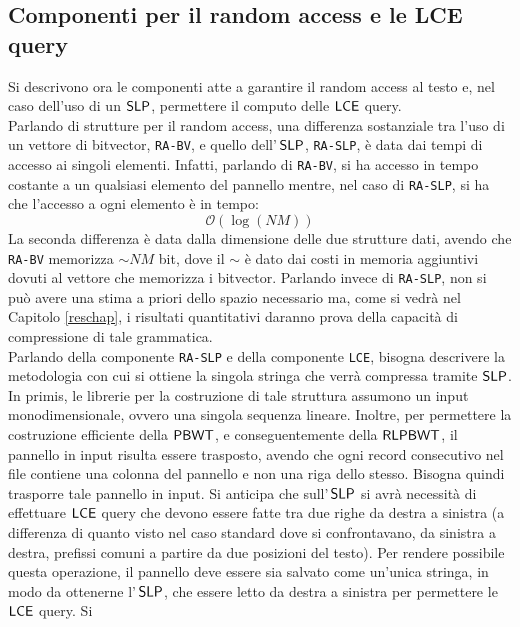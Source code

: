\subsection{Componenti per il random access e le LCE query}
Si descrivono ora le componenti atte a garantire il
random access
al testo e, nel caso dell'uso di un $\mbox{\rm {\sf SLP}}$, permettere il computo delle
$\mbox{\rm {\sf LCE}}$ query.\\
Parlando di strutture per il random access, una differenza sostanziale tra
l'uso di un vettore di bitvector, \texttt{RA-BV}, e quello
dell'$\,\mbox{\rm {\sf SLP}}$, \texttt{RA-SLP}, è data dai tempi di accesso ai singoli
elementi. Infatti, parlando di \texttt{RA-BV}, si ha accesso in tempo costante
a un qualsiasi elemento del pannello mentre, nel caso di \texttt{RA-SLP}, si ha
che l'accesso a ogni elemento è in tempo:
\begin{equation}
  \label{eq:timera}
  \mathcal{O}(\log (\mathit{NM}))
\end{equation}
La seconda differenza è data
dalla dimensione delle due strutture dati, avendo che \texttt{RA-BV} memorizza
$\sim \mathit{NM}$ bit, dove il $\sim$ è dato dai costi in memoria aggiuntivi
dovuti 
al vettore che memorizza i bitvector. Parlando invece di
\texttt{RA-SLP}, non si può avere una stima a priori dello spazio necessario ma,
come si vedrà nel Capitolo \ref{reschap}, i risultati quantitativi daranno prova
della capacità di compressione di tale grammatica.\\
Parlando della componente \texttt{RA-SLP} e della componente
\texttt{LCE}, bisogna descrivere la metodologia con cui 
si ottiene la singola stringa che verrà compressa tramite $\mbox{\rm {\sf SLP}}$.
In primis, le
librerie per la costruzione di tale struttura assumono un input
monodimensionale, ovvero una singola sequenza lineare. Inoltre, per
permettere la costruzione efficiente della $\mbox{\rm {\sf PBWT}}$, e conseguentemente
della $\mbox{\rm {\sf RLPBWT}}$, il pannello in input risulta essere trasposto, avendo che
ogni record consecutivo nel file contiene una colonna del pannello e non una
riga dello stesso. Bisogna
quindi trasporre tale pannello in input. Si anticipa che sull'$\,\mbox{\rm {\sf SLP}}$
si avrà  
necessità di effettuare $\mbox{\rm {\sf LCE}}$ query che devono essere fatte tra
due righe da destra a sinistra (a differenza 
di quanto visto nel caso standard dove si confrontavano, da sinistra a destra,
prefissi comuni a partire da due posizioni del testo). Per
rendere possibile questa operazione, il pannello deve essere sia 
salvato come un'unica stringa, in modo da ottenerne l'$\,\mbox{\rm {\sf SLP}}$, che essere letto
da destra 
a sinistra per permettere le $\mbox{\rm {\sf LCE}}$ query. Si
